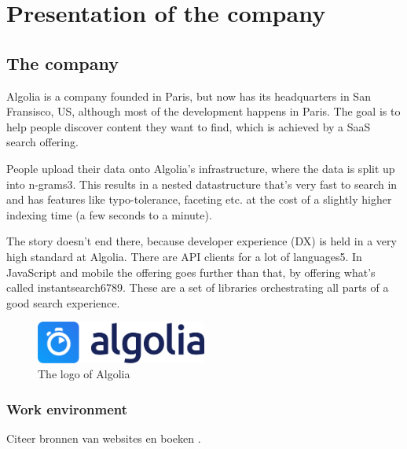 
\section{Presentation of the company} %
\label{sec:presentation}

\subsection{The company} %
\label{sub:company}

Algolia\cite{algolia-home} is a company founded in Paris, but now has its headquarters in San Fransisco, US, although most of the development happens in Paris. The goal is to help people discover content they want to find, which is achieved by a SaaS search offering.

People upload their data onto Algolia’s infrastructure, where the data is split up into n-grams3. This results in a nested datastructure that’s very fast to search in and has features like typo-tolerance, faceting etc. at the cost of a slightly higher indexing time (a few seconds to a minute).

The story doesn’t end there, because developer experience (DX) is held in a very high standard at Algolia. There are API clients for a lot of languages5. In JavaScript and mobile the offering goes further than that, by offering what’s called instantsearch6789. These are a set of libraries orchestrating all parts of a good search experience.

\begin{figure}[H]
  \label{figure:company-logo}
  \centering
  \includegraphics[width=0.5\textwidth]{../assets/algolia-logo-light.pdf}
  \caption{The logo of Algolia \cite{algolia-press}}
\end{figure}

\subsubsection{Work environment}
\label{sub:work-environment}

Citeer bronnen van websites \cite{voorbeeld-ref} en boeken \cite{boek-ref}.

\lipsum[1]

